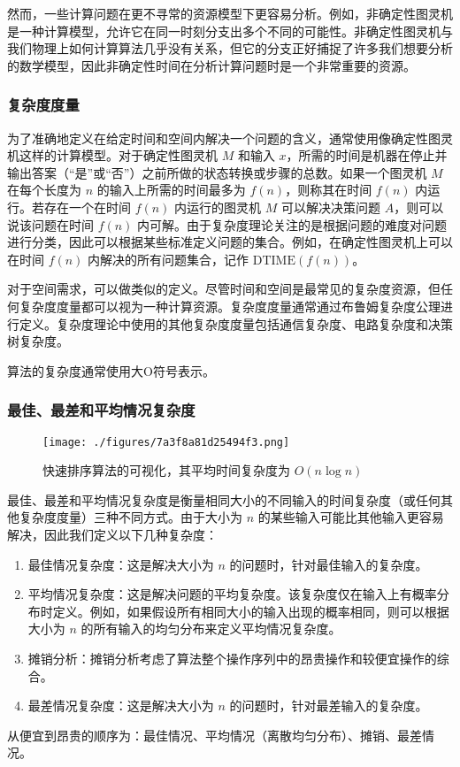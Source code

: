 然而，一些计算问题在更不寻常的资源模型下更容易分析。例如，非确定性图灵机是一种计算模型，允许它在同一时刻分支出多个不同的可能性。非确定性图灵机与我们物理上如何计算算法几乎没有关系，但它的分支正好捕捉了许多我们想要分析的数学模型，因此非确定性时间在分析计算问题时是一个非常重要的资源。
\subsubsection{复杂度度量 } 
为了准确地定义在给定时间和空间内解决一个问题的含义，通常使用像确定性图灵机这样的计算模型。对于确定性图灵机 \( M \) 和输入 \( x \)，所需的时间是机器在停止并输出答案（“是”或“否”）之前所做的状态转换或步骤的总数。如果一个图灵机 \( M \) 在每个长度为 \( n \) 的输入上所需的时间最多为 \( f(n) \)，则称其在时间 \( f(n) \) 内运行。若存在一个在时间 \( f(n) \) 内运行的图灵机 \( M \) 可以解决决策问题 \( A \)，则可以说该问题在时间 \( f(n) \) 内可解。由于复杂度理论关注的是根据问题的难度对问题进行分类，因此可以根据某些标准定义问题的集合。例如，在确定性图灵机上可以在时间 \( f(n) \) 内解决的所有问题集合，记作 \( \text{DTIME}(f(n)) \)。

对于空间需求，可以做类似的定义。尽管时间和空间是最常见的复杂度资源，但任何复杂度度量都可以视为一种计算资源。复杂度度量通常通过布鲁姆复杂度公理进行定义。复杂度理论中使用的其他复杂度度量包括通信复杂度、电路复杂度和决策树复杂度。

算法的复杂度通常使用大O符号表示。
\subsubsection{最佳、最差和平均情况复杂度}
\begin{figure}[ht]
\centering
\texttt{[image: ./figures/7a3f8a81d25494f3.png]}
\caption{快速排序算法的可视化，其平均时间复杂度为 \( O(n \log n) \)} \label{fig_JSFZ_4}
\end{figure}
最佳、最差和平均情况复杂度是衡量相同大小的不同输入的时间复杂度（或任何其他复杂度度量）三种不同方式。由于大小为 \( n \) 的某些输入可能比其他输入更容易解决，因此我们定义以下几种复杂度：
\begin{enumerate}
\item 最佳情况复杂度：这是解决大小为 \( n \) 的问题时，针对最佳输入的复杂度。
\item 平均情况复杂度：这是解决问题的平均复杂度。该复杂度仅在输入上有概率分布时定义。例如，如果假设所有相同大小的输入出现的概率相同，则可以根据大小为 \( n \) 的所有输入的均匀分布来定义平均情况复杂度。
\item 摊销分析：摊销分析考虑了算法整个操作序列中的昂贵操作和较便宜操作的综合。
\item 最差情况复杂度：这是解决大小为 \( n \) 的问题时，针对最差输入的复杂度。
\end{enumerate}
从便宜到昂贵的顺序为：最佳情况、平均情况（离散均匀分布）、摊销、最差情况。

